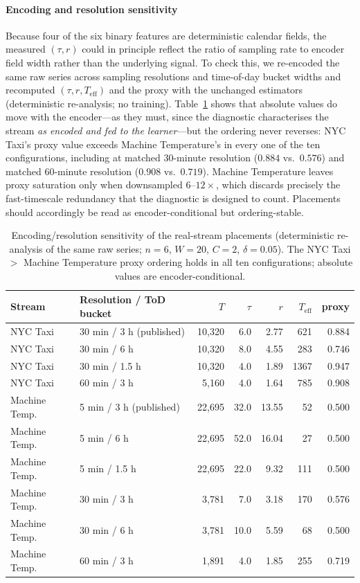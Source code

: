 \documentclass[sensors,article,submit,pdftex,moreauthors]{Definitions/mdpi}
\newcommand{\Teff}{T_{\mathrm{eff}}}
\begin{document}
\paragraph{Encoding and resolution sensitivity} Because four of the six binary features are deterministic calendar fields, the measured $(\tau, r)$ could in principle reflect the ratio of sampling rate to encoder field width rather than the underlying signal. To check this, we re-encoded the same raw series across sampling resolutions and time-of-day bucket widths and recomputed $(\tau, r, \Teff)$ and the proxy with the unchanged estimators (deterministic re-analysis; no training). Table~\ref{tab:encoder_sens} shows that absolute values do move with the encoder---as they must, since the diagnostic characterises the stream \emph{as encoded and fed to the learner}---but the ordering never reverses: NYC Taxi's proxy value exceeds Machine Temperature's in every one of the ten configurations, including at matched 30-minute resolution ($0.884$ vs.\ $0.576$) and matched 60-minute resolution ($0.908$ vs.\ $0.719$). Machine Temperature leaves proxy saturation only when downsampled $6$--$12\times$, which discards precisely the fast-timescale redundancy that the diagnostic is designed to count. Placements should accordingly be read as encoder-conditional but ordering-stable.

\begin{table}[t]
\centering
\caption{Encoding/resolution sensitivity of the real-stream placements (deterministic re-analysis of the same raw series; $n = 6$, $W = 20$, $C = 2$, $\delta = 0.05$). The NYC Taxi $>$ Machine Temperature proxy ordering holds in all ten configurations; absolute values are encoder-conditional.}
\label{tab:encoder_sens}
\small
\begin{tabular}{@{}llrrrrr@{}}
\toprule
Stream & Resolution / ToD bucket & $T$ & $\tau$ & $r$ & $\Teff$ & proxy \\
\midrule
NYC Taxi & 30 min / 3 h (published) & 10{,}320 & 6.0 & 2.77 & 621 & 0.884 \\
NYC Taxi & 30 min / 6 h & 10{,}320 & 8.0 & 4.55 & 283 & 0.746 \\
NYC Taxi & 30 min / 1.5 h & 10{,}320 & 4.0 & 1.89 & 1367 & 0.947 \\
NYC Taxi & 60 min / 3 h & 5{,}160 & 4.0 & 1.64 & 785 & 0.908 \\
\midrule
Machine Temp. & 5 min / 3 h (published) & 22{,}695 & 32.0 & 13.55 & 52 & 0.500 \\
Machine Temp. & 5 min / 6 h & 22{,}695 & 52.0 & 16.04 & 27 & 0.500 \\
Machine Temp. & 5 min / 1.5 h & 22{,}695 & 22.0 & 9.32 & 111 & 0.500 \\
Machine Temp. & 30 min / 3 h & 3{,}781 & 7.0 & 3.18 & 170 & 0.576 \\
Machine Temp. & 30 min / 6 h & 3{,}781 & 10.0 & 5.59 & 68 & 0.500 \\
Machine Temp. & 60 min / 3 h & 1{,}891 & 4.0 & 1.85 & 255 & 0.719 \\
\bottomrule
\end{tabular}
\end{table}
\end{document}
